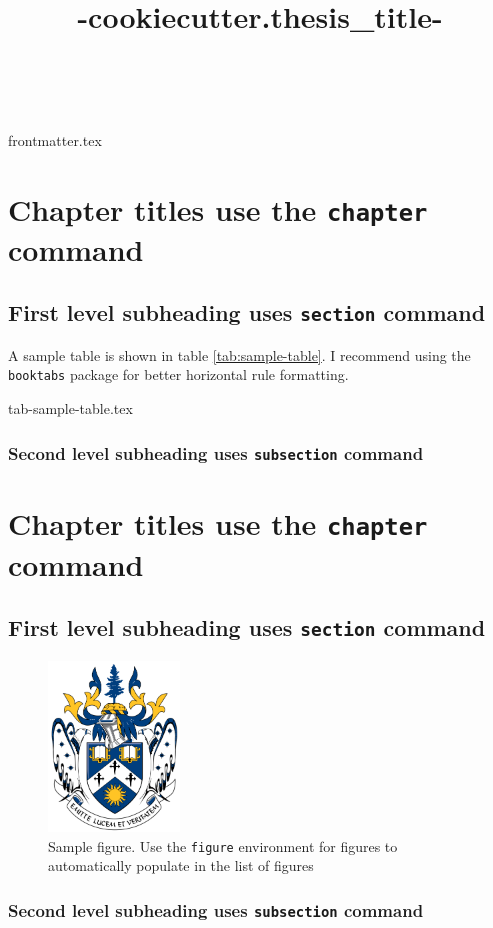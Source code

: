 \documentclass[openany, 12pt]{book}
\title{ {{-cookiecutter.thesis_title-}} }
\author{\givenname\ \surname}
\begin{document}
{frontmatter.tex}

\chapter{Chapter titles use the \texttt{chapter} command}

\section{First level subheading uses \texttt{section} command}

A sample table is shown in table \ref{tab:sample-table}.
I recommend using the \texttt{booktabs} package for better horizontal rule formatting.

{tab-sample-table.tex}

\subsection{Second level subheading uses \texttt{subsection} command}

\chapter{Chapter titles use the \texttt{chapter} command}

\section{First level subheading uses \texttt{section} command}

\begin{figure}
    \centering
    \includegraphics[width=3.5cm]{laurentian-university-coa.png}
    \caption{Sample figure. Use the \texttt{figure} environment for figures to automatically populate in the list of figures}
\end{figure}

\subsection{Second level subheading uses \texttt{subsection} command}
\end{document}

